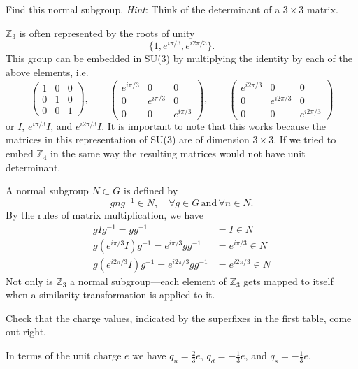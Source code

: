 \documentclass[../road-to-reality.tex]{subfiles}
\begin{document}
\begin{questions}
		\question Find this normal subgroup. \textit{Hint}: Think of the determinant of a $3\times3$ matrix.
		
		\begin{solution}
			$\mathbb{Z}_3$ is often represented by the roots of unity
			\[
				\{1, e^{i\pi/3}, e^{i2\pi/3}\}.
			\]
			This group can be embedded in SU(3) by multiplying the identity by each of the above elements, i.e.
			\[
				\begin{pmatrix}1 & 0 & 0 \\ 0 & 1 & 0 \\ 0 & 0 & 1\end{pmatrix},\qquad \begin{pmatrix}e^{i\pi/3}  & 0 & 0 \\ 0 & e^{i\pi/3} & 0 \\ 0 & 0 & e^{i\pi/3}\end{pmatrix},\qquad \begin{pmatrix}e^{i2\pi/3}  & 0 & 0 \\ 0 & e^{i2\pi/3} & 0 \\ 0 & 0 & e^{i2\pi/3}\end{pmatrix}
			\]
			or $I$, $e^{i\pi/3}I$, and $e^{i2\pi/3}I$. It is important to note that this works because the matrices in this representation of SU(3) are of dimension $3\times3$. If we tried to embed $\mathbb{Z}_4$ in the same way the resulting matrices would not have unit determinant.
			
			A normal subgroup $N \subset G$ is defined by
			\[
				gng^{-1} \in N,\quad \forall g\in G\,\text{and}\,\forall n \in N.
			\]
			By the rules of matrix multiplication, we have
			\begin{align*}
				gIg^{-1} = gg^{-1} &= I \in N \\
				g(e^{i\pi/3}I)g^{-1} = e^{i\pi/3}gg^{-1} &= e^{i\pi/3} \in N \\
				g(e^{i2\pi/3}I)g^{-1} = e^{i2\pi/3}gg^{-1} &= e^{i2\pi/3} \in N
			\end{align*}
			Not only is $\mathbb{Z}_3$ a normal subgroup---each element of $\mathbb{Z}_3$ gets mapped to itself when a similarity transformation is applied to it.
		\end{solution}
		
		\question Check that the charge values, indicated by the superfixes in the first table, come out right.
		
		\begin{solution}
			In terms of the unit charge $e$ we have $q_u = \frac{2}{3}e$, $q_d = -\frac{1}{3}e$, and $q_s = -\frac{1}{3}e$.
		\end{solution}
		

\end{questions}
\end{document}
